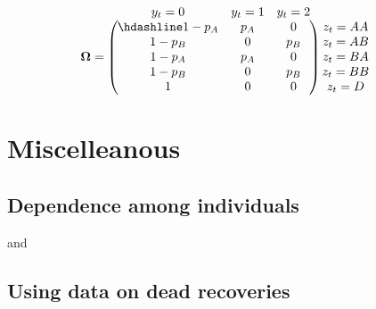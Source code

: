 \documentclass[
  12pt,
]{krantz}
\begin{document}
\[
\begin{matrix}
& \\
\mathbf{\Omega} =
\left ( \vphantom{ \begin{matrix} 12 \\ 12 \\ 12 \\ 12 \\ 12\end{matrix} } \right .
\end{matrix}
\hspace{-1.2em}
\begin{matrix}
y_t=0 & y_t=1 & y_t=2 \\ \hdashline
1 - p_A & p_A & 0\\
1 - p_B & 0 & p_B\\
1 - p_A & p_A & 0\\
1 - p_B & 0 & p_B\\
1 & 0 & 0
\end{matrix}
\hspace{-0.2em}
\begin{matrix}
& \\
\left . \vphantom{ \begin{matrix} 12 \\ 12 \\ 12 \\ 12 \\ 12\end{matrix} } \right )
\begin{matrix}
z_t=AA \\ z_t=AB \\ z_t=BA \\ z_t=BB \\ z_t=D
\end{matrix}
\end{matrix}
\]

\hypertarget{misc}{%
\chapter{Miscelleanous}\label{misc}}

\hypertarget{dependence-among-individuals}{%
\section{Dependence among individuals}\label{dependence-among-individuals}}

\citet{culina_multievent_2013} and \citet{cubaynes_modeling_2021}

\hypertarget{using-data-on-dead-recoveries}{%
\section{Using data on dead recoveries}\label{using-data-on-dead-recoveries}}
\end{document}
